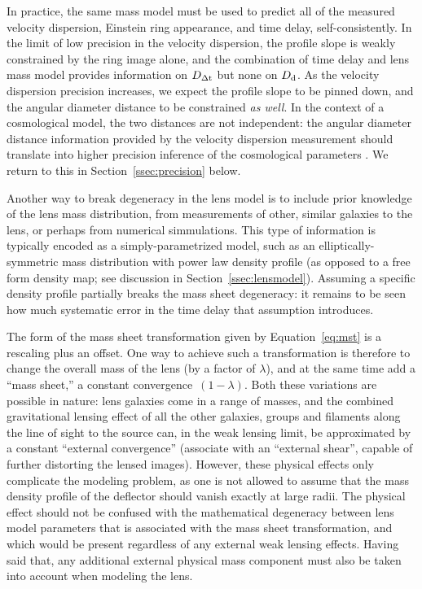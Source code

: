 In practice, the same mass model must be used to predict all of the
measured velocity dispersion, Einstein ring appearance, and time
delay, self-consistently. In the limit of low precision in the
velocity dispersion, the profile slope is weakly constrained by the
ring image alone, and the combination of time delay and lens mass
model provides information on $D_{\Delta{\rm t}}$ but none on $D_{\rm d}$. As the
velocity dispersion precision increases, we expect the profile slope
to be pinned down, and the angular diameter distance to be constrained
{\it as well}. In the context of a cosmological model, the two
distances are not independent: the angular diameter distance
information provided by the velocity dispersion measurement should
translate into higher precision inference of the cosmological
parameters \citep{JeeEtal2016}.  We return to this in
Section~\ref{ssec:precision} below.

Another way to break degeneracy in the lens model is to include prior
knowledge of the lens mass distribution, from measurements of other,
similar galaxies to the lens, or perhaps from numerical
simmulations. This type of information is typically encoded as a
simply-parametrized model, such as an elliptically-symmetric mass
distribution with power law density profile (as opposed to a free form
density map; see discussion in Section~\ref{ssec:lensmodel}). Assuming
a specific density profile partially breaks the mass sheet degeneracy:
it remains to be seen how much systematic error in the time delay
that assumption introduces.


The form of the mass sheet transformation given by
Equation~\ref{eq:mst} is a rescaling plus an offset. One way to
achieve such a transformation is therefore to change the overall mass
of the lens (by a factor of $\lambda$), and at the same time add a
``mass sheet,'' a constant convergence~$(1-\lambda)$.  Both these
variations are possible in nature: lens galaxies come in a range of
masses, and the combined gravitational lensing effect of all the other
galaxies, groups and filaments along the line of sight to the source
can, in the weak lensing limit, be approximated by a constant
``external convergence'' (associate with an ``external shear'',
capable of further distorting the lensed images). However, these
physical effects only complicate the modeling problem, as one is not
allowed to assume that the mass density profile of the deflector
should vanish exactly at large radii.  The physical effect should not
be confused with the mathematical degeneracy between lens model
parameters that is associated with the mass sheet transformation, and
which would be present regardless of any external weak lensing
effects. Having said that, any additional external physical mass
component must also be taken into account when modeling the lens.

